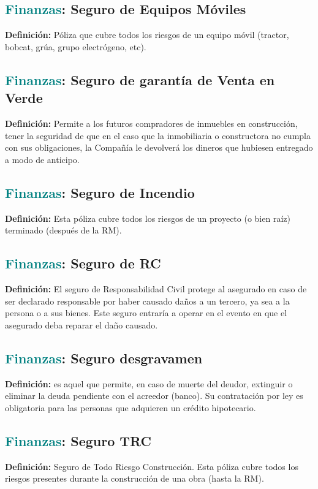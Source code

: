 \documentclass[12pt]{article}
\begin{document}
\subsection{\textcolor{teal}{Finanzas}: Seguro de Equipos Móviles}
\textbf{Definición:} Póliza que cubre todos los riesgos de un equipo móvil (tractor, bobcat, grúa, grupo electrógeno, etc).
\subsection{\textcolor{teal}{Finanzas}: Seguro de garantía de Venta en Verde}
\textbf{Definición:} Permite a los futuros compradores de inmuebles en construcción, tener la seguridad de que en el caso que la inmobiliaria o constructora no cumpla con sus obligaciones, la Compañía le devolverá los dineros que hubiesen entregado a modo de anticipo.
\subsection{\textcolor{teal}{Finanzas}: Seguro de Incendio}
\textbf{Definición:} Esta póliza cubre todos los riesgos de un proyecto (o bien raíz) terminado (después de la RM).
\subsection{\textcolor{teal}{Finanzas}: Seguro de RC}
\textbf{Definición:} El seguro de Responsabilidad Civil protege al asegurado en caso de ser declarado responsable por haber causado daños a un tercero, ya sea a la persona o a sus bienes. Este seguro entraría a operar en el evento en que el asegurado deba reparar el daño causado.
\subsection{\textcolor{teal}{Finanzas}: Seguro desgravamen}
\textbf{Definición:} es aquel que permite, en caso de muerte del deudor, extinguir o eliminar la deuda pendiente con el acreedor (banco). Su contratación por ley es obligatoria para las personas que adquieren un crédito hipotecario.
\subsection{\textcolor{teal}{Finanzas}: Seguro TRC}
\textbf{Definición:} Seguro de Todo Riesgo Construcción. Esta póliza cubre todos los riesgos presentes durante la construcción de una obra (hasta la RM).
\end{document}
